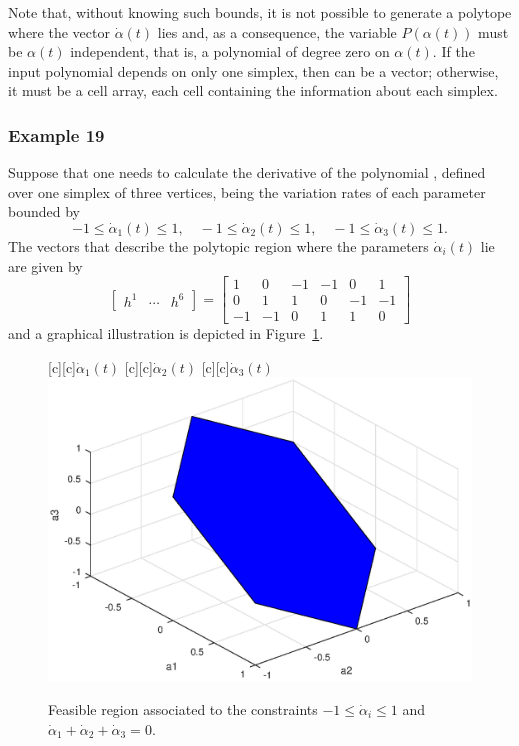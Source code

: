 \documentclass[english,11pt]{article}
\theoremstyle{break} \theorembodyfont{\small\rm}
\begin{document}
Note that, without knowing such bounds, it is not possible to 
generate a polytope where the vector $\dot{\alpha}(t)$ lies and, as a consequence, the variable $P(\alpha(t))$ must be $\alpha(t)$ independent, that is, a polynomial of degree zero on $\alpha(t)$. If the input polynomial 
depends on only one simplex, then  can be a vector; otherwise, 
it must be a cell array, each cell containing the information about each simplex.

\subsubsection*{Example 19}

Suppose that one needs to calculate the derivative of the polynomial , 
defined over one simplex of three vertices, being the variation rates of each
parameter bounded by
\[
-1 \leq \dot{\alpha}_1(t) \leq 1, \quad -1 \leq \dot{\alpha}_2(t) \leq 1, \quad 
-1 \leq \dot{\alpha}_3(t) \leq 1.
\]
The vectors that describe the polytopic region where the parameters $\dot{\alpha}_i(t)$ lie are given by
\[
\begin{bmatrix}
h^1 & \cdots & h^6
\end{bmatrix}=\begin{bmatrix}
1  &  0  &  -1  &  -1  &  0  &  1  \\ 
0  &  1  &  1  &  0  &  -1  &  -1  \\ 
-1  &  -1  &  0  &  1  &  1  &  0\end{bmatrix}
\]
and a graphical illustration is depicted in Figure~\ref{fig:dot:alphas}.
\begin{figure}[!ht]
	\begin{center}
		\begin{psfrags}
			[c][c]{$\dot{\alpha}_1(t)$}
			[c][c]{$\dot{\alpha}_2(t)$}
			[c][c]{$\dot{\alpha}_3(t)$}
			\includegraphics[width=0.5\linewidth]{figPlanoN3_c.eps}
		\end{psfrags}
	\end{center}
	\caption{Feasible region associated to the constraints $-1\leq \dot{\alpha}_i \leq 1$ and $\dot{\alpha}_1+\dot{\alpha}_2+\dot{\alpha}_3=0$. \label{fig:dot:alphas}}
	
\end{figure} 
\end{document}
